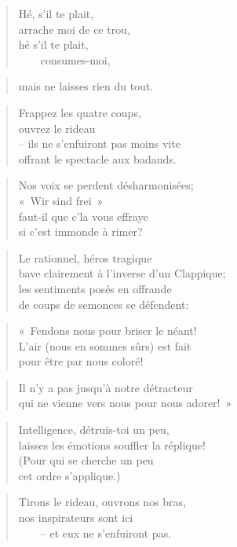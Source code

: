   \begin{verse}
    Hé, s’il te plait,\\
    arrache moi de ce trou,\\
    hé s’il te plait,\\
    ~~~~consumes-moi,
  \end{verse}
  \begin{verse}
    mais ne laisses rien du tout.
  \end{verse}
  \begin{verse}
    Frappez les quatre coups,\\
    ouvrez le rideau\\
    -- ils ne s’enfuiront pas moins vite\\
    offrant le spectacle aux badauds.
  \end{verse}
  \begin{verse}
    Nos voix se perdent désharmonisées;\\
    «~Wir sind frei~»\\
    faut-il que c’la vous effraye\\
    si c’est immonde à rimer?
  \end{verse}
  \begin{verse}
    Le rationnel, héros tragique\\
    bave clairement à l’inverse d’un Clappique;\\
    les sentiments posés en offrande\\
    de coups de semonces se défendent:
  \end{verse}
  \begin{verse}
    «~Fendons nous pour briser le néant!\\
    L’air (nous en sommes sûrs) est fait\\
    pour être par nous coloré!
  \end{verse}
  \begin{verse}
    Il n’y a pas jusqu’à notre détracteur\\
    qui ne vienne vers nous pour nous adorer!~»
  \end{verse}
  \begin{verse}
    Intelligence, détruis-toi un peu,\\
    laisses les émotions souffler la réplique!\\
    (Pour qui se cherche un peu\\
    cet ordre s’applique.)
  \end{verse}
  \begin{verse}
    Tirons le rideau, ouvrons nos bras,\\
    nos inspirateurs sont ici\\
    ~~~~-- et eux ne s’enfuiront pas.
  \end{verse}
